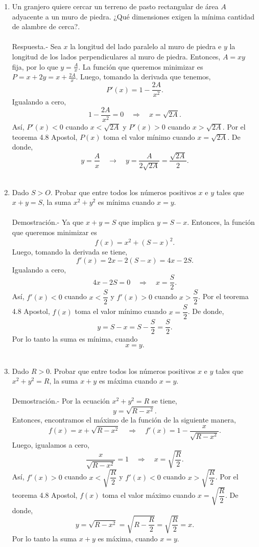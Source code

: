\begin{enumerate}[\bfseries 1.]
    \item Un granjero quiere cercar un terreno de pasto rectangular de área $A$ adyacente a un muro de piedra. ¿Qué dimensiones exigen la mínima cantidad de alambre de cerca?.\\\\
	Respuesta.-\; Sea $x$ la longitud del lado paralelo al muro de piedra e $y$ la longitud de los lados perpendiculares al muro de piedra. Entonces, $A = xy$ fija, por lo que $y = \frac{A}{x}$. La función que queremos minimizar es $P = x + 2y = x + \frac{2A}{x}$. Luego, tomando la derivada que tenemos,
	$$P'(x)=1-\dfrac{2A}{x^2}.$$
	Igualando a cero,
	$$1-\dfrac{2A}{x^2}=0\quad \Rightarrow \quad x=\sqrt{2A}.$$
	Así, $P'(x)<0$ cuando $x<\sqrt{2A}$ y $P'(x)>0$ cuando $x>\sqrt{2A}$. Por el teorema 4.8 Apostol, $P(x)$ toma el valor mínimo cuando $x=\sqrt{2A}$. De donde,
	$$y=\dfrac{A}{x}\quad \rightarrow \quad y=\dfrac{A}{2\sqrt{2A}}=\dfrac{\sqrt{2A}}{2}.$$\\

    \item Dado $S > O$. Probar que entre todos los números positivos $x$ e $y$ tales que $x + y = S$, la suma $x^2 + y^2$ es mínima cuando $x=y$.\\\\
	Demostración.-\;  Ya que $x+y=S$ que implica $y=S-x$. Entonces, la función que queremos minimizar es 
	$$f(x)=x^2+(S-x)^2.$$ 
	Luego, tomando la derivada se tiene,
	$$f'(x)=2x-2(S-x)=4x-2S.$$
	Igualando a cero,
	$$4x-2S=0\quad \Rightarrow \quad x=\dfrac{S}{2}.$$
	Así, $f'(x)<0$ cuando $x<\dfrac{S}{2}$ y $f'(x)>0$ cuando $x>\dfrac{S}{2}$. Por el teorema 4.8 Apostol, $f(x)$ toma el valor mínimo cuando $x=\dfrac{S}{2}$. De donde,
	$$y=S-x=S-\dfrac{S}{2}=\dfrac{S}{2}.$$
	Por lo tanto la suma es mínima, cuando 
	$$x=y.$$\\

    \item Dado $R > 0$. Probar que entre todos los números positivos $x$ e $y$ tales que $x^2 + y^2 = R$, la suma $x + y$ es máxima cuando $x = y$.\\\\
	Demostración.-\; Por la ecuación $x^2+y^2=R$ se tiene,
	$$y=\sqrt{R-x^2}.$$
	Entonces, encontramos el máximo de la función de la siguiente manera,
	$$f(x)=x+\sqrt{R-x^2}\quad \Rightarrow \quad f'(x)=1-\dfrac{x}{\sqrt{R-x^2}}.$$
	Luego, igualamos a cero,
	$$\dfrac{x}{\sqrt{R-x^2}}=1\quad \Rightarrow \quad x=\sqrt{\dfrac{R}{2}}.$$
	Así, $f'(x)>0$ cuando $x<\sqrt{\dfrac{R}{2}}$ y $f'(x)<0$ cuando $x>\sqrt{\dfrac{R}{2}}$. Por el teorema 4.8 Apostol, $f(x)$ toma el valor máximo cuando $x=\sqrt{\dfrac{R}{2}}$. De donde,
	$$y=\sqrt{R-x^2}=\sqrt{R-\dfrac{R}{2}}=\sqrt{\dfrac{R}{2}}=x.$$
	Por lo tanto la suma $x+y$ es máxima, cuando $x=y$.\\\\


\end{enumerate}
